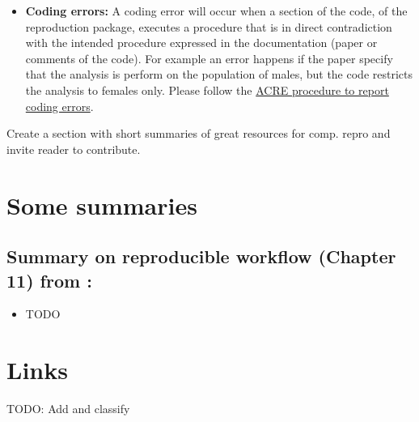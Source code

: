 \documentclass[]{book}
\providecommand{\tightlist}{%
  \setlength{\itemsep}{0pt}\setlength{\parskip}{0pt}}
\begin{document}
\begin{itemize}
\tightlist
\item
  \textbf{Coding errors:} A coding error will occur when a section of the code, of the reproduction package, executes a procedure that is in direct contradiction with the intended procedure expressed in the documentation (paper or comments of the code). For example an error happens if the paper specify that the analysis is perform on the population of males, but the code restricts the analysis to females only. Please follow the \href{ADD\%20LINK}{ACRE procedure to report coding errors}.
\end{itemize}

Create a section with short summaries of great resources for comp. repro and invite reader to contribute.

\hypertarget{some-summaries}{%
\section{Some summaries}\label{some-summaries}}

\hypertarget{summary-on-reproducible-workflow-chapter-11-from-christensen2019transparent}{%
\subsection{\texorpdfstring{Summary on reproducible workflow (Chapter 11) from \citet{christensen2019transparent}:}{Summary on reproducible workflow (Chapter 11) from @christensen2019transparent:}}\label{summary-on-reproducible-workflow-chapter-11-from-christensen2019transparent}}

\begin{itemize}
\tightlist
\item
  TODO
\end{itemize}

\hypertarget{links}{%
\section{Links}\label{links}}

TODO: Add and classify
\end{document}
